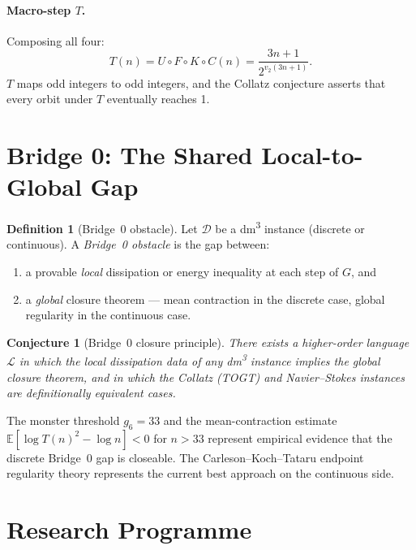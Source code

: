 \documentclass[11pt,a4paper]{article}
\theoremstyle{definition}
\newtheorem{defn}{Definition}
\theoremstyle{plain}
\newtheorem{conj}{Conjecture}
\begin{document}
\paragraph{Macro-step $T$.}
Composing all four:
\[
  T(n) = U \circ F \circ K \circ C(n) = \frac{3n+1}{2^{v_2(3n+1)}}.
\]
$T$ maps odd integers to odd integers, and the Collatz conjecture asserts that every orbit
under $T$ eventually reaches 1.

\section{Bridge 0: The Shared Local-to-Global Gap}
\label{sec:bridge0}

\begin{defn}[Bridge~0 obstacle]
Let $\mathcal{D}$ be a dm\textsuperscript{3} instance (discrete or continuous). A
\emph{Bridge~0 obstacle} is the gap between:
\begin{enumerate}
  \item a provable \emph{local} dissipation or energy inequality at each step of $G$, and
  \item a \emph{global} closure theorem --- mean contraction in the discrete case, global
        regularity in the continuous case.
\end{enumerate}
\end{defn}

\begin{conj}[Bridge~0 closure principle]
There exists a higher-order language $\mathcal{L}$ in which the local dissipation data of any
dm\textsuperscript{3} instance implies the global closure theorem, and in which the Collatz
(TOGT) and Navier--Stokes instances are definitionally equivalent cases.
\end{conj}

The monster threshold $g_6 = 33$ and the mean-contraction estimate
$\mathbb{E}[\log T(n)^2 - \log n] < 0$ for $n > 33$ represent empirical evidence that the
discrete Bridge~0 gap is closeable. The Carleson--Koch--Tataru endpoint regularity theory
represents the current best approach on the continuous side.

\section{Research Programme}
\label{sec:programme}
\end{document}
